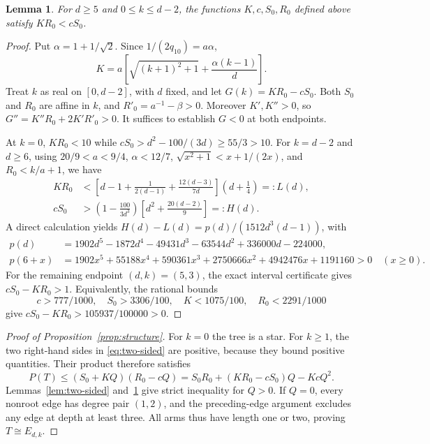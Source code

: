 \documentclass[11pt,a4paper]{article}
\numberwithin{equation}{section}
\newtheorem{lemma}[theorem]{Lemma}
\begin{document}
\begin{lemma}\label{lem:strict-comparison}
For $d\ge5$ and $0\le k\le d-2$, the functions $K,c,S_0,R_0$ defined above satisfy $KR_0<cS_0$.
\end{lemma}
\begin{proof}
Put $\alpha=1+1/\sqrt2$. Since $1/(2q_{10})=a\alpha$,
\[K=a\left[\sqrt{(k+1)^2+1}+\frac{\alpha(k-1)}d\right].
\]
Treat $k$ as real on $[0,d-2]$, with $d$ fixed, and let $G(k)=KR_0-cS_0$. Both $S_0$ and $R_0$ are affine in $k$, and $R'_0=a^{-1}-\beta>0$. Moreover $K',K''>0$, so
$G''=K''R_0+2K'R'_0>0$. It suffices to establish $G<0$ at both endpoints.

At $k=0$, $KR_0<10$ while
$cS_0>d^2-100/(3d)\ge55/3>10$. For $k=d-2$ and $d\ge6$, using
$20/9<a<9/4$, $\alpha<12/7$, $\sqrt{x^2+1}<x+1/(2x)$, and $R_0<k/a+1$, we have
\begin{align*}
KR_0&<\left[d-1+\frac1{2(d-1)}+\frac{12(d-3)}{7d}\right]\left(d+\frac14\right)=:L(d),\\
cS_0&>\left(1-\frac{100}{3d^3}\right)\left[d^2+\frac{20(d-2)}9\right]=:H(d).
\end{align*}
A direct calculation yields $H(d)-L(d)=p(d)/(1512d^3(d-1))$, with
\begin{align*}
p(d)&=1902d^5-1872d^4-49431d^3-63544d^2+336000d-224000,\\
p(6+x)&=1902x^5+55188x^4+590361x^3+2750666x^2
+4942476x+1191160>0 \quad(x\ge0).
\end{align*}
For the remaining endpoint $(d,k)=(5,3)$, the exact interval certificate gives $cS_0-KR_0>1$. Equivalently, the rational bounds
\[c>777/1000,\quad S_0>3306/100,\quad K<1075/100,\quad R_0<2291/1000
\]
give $cS_0-KR_0>105937/100000>0$.
\end{proof}
\begin{proof}[Proof of Proposition~\ref{prop:structure}]
For $k=0$ the tree is a star. For $k\ge1$, the two right-hand sides in \eqref{eq:two-sided} are positive, because they bound positive quantities. Their product therefore satisfies
\[
P(T)\le(S_0+KQ)(R_0-cQ)
=S_0R_0+(KR_0-cS_0)Q-KcQ^2.
\]
Lemmas~\ref{lem:two-sided} and~\ref{lem:strict-comparison} give strict inequality for $Q>0$. If $Q=0$, every nonroot edge has degree pair $(1,2)$, and the preceding-edge argument excludes any edge at depth at least three. All arms thus have length one or two, proving $T\cong E_{d,k}$.
\end{proof}
\end{document}
